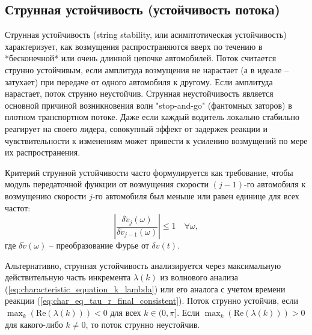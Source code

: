 \documentclass[12pt, a4paper]{article}
\begin{document}
\subsection{Струнная устойчивость (устойчивость потока)}
\label{subsec:string_stability}

Струнная устойчивость (string stability, или асимптотическая устойчивость) характеризует, как возмущения распространяются вверх по течению в *бесконечной* или очень длинной цепочке автомобилей. Поток считается струнно устойчивым, если амплитуда возмущения не нарастает (а в идеале – затухает) при передаче от одного автомобиля к другому. Если амплитуда нарастает, поток струнно неустойчив.
Струнная неустойчивость является основной причиной возникновения волн "stop-and-go" (фантомных заторов) в плотном транспортном потоке. Даже если каждый водитель локально стабильно реагирует на своего лидера, совокупный эффект от задержек реакции и чувствительности к изменениям может привести к усилению возмущений по мере их распространения.

Критерий струнной устойчивости часто формулируется как требование, чтобы модуль передаточной функции от возмущения скорости $(j-1)$-го автомобиля к возмущению скорости $j$-го автомобиля был меньше или равен единице для всех частот:
\[ \left| \frac{\delta \tilde{v}_j(\omega)}{\delta \tilde{v}_{j-1}(\omega)} \right| \le 1 \quad \forall \omega, \]
где $\delta \tilde{v}(\omega)$ – преобразование Фурье от $\delta v(t)$.

Альтернативно, струнная устойчивость анализируется через максимальную действительную часть инкремента $\lambda(k)$ из волнового анализа (\ref{eq:characteristic_equation_k_lambda}) или его аналога с учетом времени реакции (\ref{eq:char_eq_tau_r_final_consistent}). Поток струнно устойчив, если $\max_k (\text{Re}(\lambda(k))) < 0$ для всех $k \in (0, \pi]$. Если $\max_k (\text{Re}(\lambda(k))) > 0$ для какого-либо $k \neq 0$, то поток струнно неустойчив.
\end{document}
